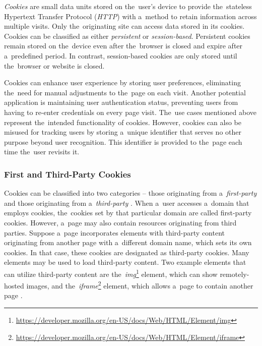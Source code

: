 \textit{Cookies} \cite{cookies-rfc} are small data units stored on the~user's device to provide the~stateless Hypertext Transfer Protocol (\textit{HTTP}) with a~method to retain information across multiple visits. Only the~originating site can access data stored in its cookies. Cookies can be classified as either \textit{persistent} or \textit{session-based}. Persistent cookies remain stored on the~device even after the~browser is closed and expire after a~predefined period. In contrast, session-based cookies are only stored until the~browser or website is closed.

Cookies can enhance user experience by storing user preferences, eliminating the~need for manual adjustments to the~page on each visit. Another potential application is maintaining user authentication status, preventing users from having to re-enter credentials on every page visit. The~use cases mentioned above represent the~intended functionality of cookies. However, cookies can also be misused for tracking users by storing a~unique identifier that serves no other purpose beyond user recognition. This identifier is provided to the~page each time the~user revisits it.

\subsubsection{First and Third-Party Cookies}
Cookies can be classified into two categories -- those originating from a~\textit{first-party} and those originating from a~\textit{third-party} \cite{first-third-party-cookies, cookies-use-iframe}. When a~user accesses a~domain that employs cookies, the~cookies set by that particular domain are called first-party cookies. However, a~page may also contain resources originating from third parties. Suppose a~page incorporates elements with third-party content originating from another page with a~different domain name, which sets its own cookies. In that case, these cookies are designated as third-party cookies. Many elements may be used to load third-party content. Two example elements that can utilize third-party content are the~\textit{img}\footnote{\url{https://developer.mozilla.org/en-US/docs/Web/HTML/Element/img}} element, which can show remotely-hosted images, and the~\textit{iframe}\footnote{\url{https://developer.mozilla.org/en-US/docs/Web/HTML/Element/iframe}} element, which allows a~page to contain another page \cite{ad-trackers, cookies-use-iframe}.

